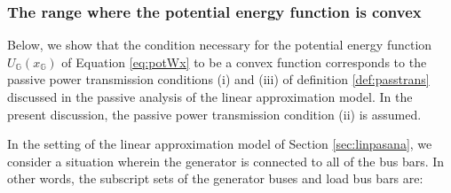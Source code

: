\documentclass[graybox, envcountchap]{svmult}
\begin{document}
%
%

\smallskip
\subsubsection{The range where the potential energy function is convex}

Below, we show that the condition necessary for the potential energy function $U_{\mathds{G}}(x_{\mathds{G}})$ of Equation \ref{eq:potWx} to be a convex function corresponds to the passive power transmission conditions (i) and (iii) of definition \ref{def:passtrans} discussed in the passive analysis of the linear approximation model.
In the present discussion, the passive power transmission condition (ii) is assumed.

In the setting of the linear approximation model of Section \ref{sec:linpasana}, we consider a situation wherein the generator is connected to all of the bus bars.
In other words, the subscript sets of the generator buses and load bus bars are:
\end{document}
